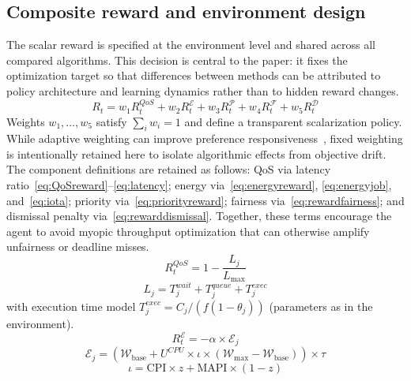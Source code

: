 \documentclass[journal]{IEEEtran}
\begin{document}
\subsection{Composite reward and environment design}
The scalar reward is specified at the environment level and shared across all compared algorithms. This decision is central to the paper: it fixes the optimization target so that differences between methods can be attributed to policy architecture and learning dynamics rather than to hidden reward changes.
\begin{equation}
R_t = w_1 R_t^{QoS} + w_2 R_t^{\mathcal{E}} + w_3 R_t^{\mathcal{P}} + w_4 R_t^{\mathcal{F}} + w_5 R_t^{\mathcal{D}} \label{eq:reward}
\end{equation}
Weights $w_1,\ldots,w_5$ satisfy $\sum_i w_i=1$ and define a transparent scalarization policy. While adaptive weighting can improve preference responsiveness~\cite{mao2016resource}, fixed weighting is intentionally retained here to isolate algorithmic effects from objective drift. The component definitions are retained as follows: QoS via latency ratio~\eqref{eq:QoSreward}--\eqref{eq:latency}; energy via~\eqref{eq:energyreward}, \eqref{eq:energyjob}, and~\eqref{eq:iota}; priority via~\eqref{eq:priorityreward}; fairness via~\eqref{eq:rewardfairness}; and dismissal penalty via~\eqref{eq:rewarddismissal}. Together, these terms encourage the agent to avoid myopic throughput optimization that can otherwise amplify unfairness or deadline misses.
\begin{equation}
R_t^{QoS} = 1 - \frac{L_j}{L_{\max}} \label{eq:QoSreward}
\end{equation}
\begin{equation}
L_j = T^{wait}_j + T^{queue}_j + T^{exec}_j \label{eq:latency}
\end{equation}
with execution time model $T^{exec}_j = C_j / (f (1 - \theta_j))$ (parameters as in the environment).
\begin{equation}
R_t^{\mathcal{E}} = -\alpha \times \mathcal{E}_j \label{eq:energyreward}
\end{equation}
\begin{equation}
\mathcal{E}_j = \left( \mathcal{W}_{\text{base}} + U^{CPU} \times \iota \times (\mathcal{W}_{\text{max}} - \mathcal{W}_{\text{base}}) \right) \times \tau \label{eq:energyjob}
\end{equation}
\begin{equation}
\iota = \text{CPI} \times z + \text{MAPI} \times (1 - z) \label{eq:iota}
\end{equation}
\end{document}
